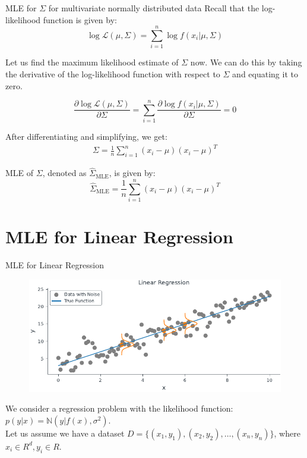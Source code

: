 \documentclass[handout]{beamer}
\begin{document}
\begin{frame}{MLE for $\Sigma$ for multivariate normally distributed data}
    Recall that the log-likelihood function is given by:
    \begin{equation}
        \log \mathcal{L}(\mu, \Sigma) = \sum_{i=1}^n \log f(x_i|\mu, \Sigma)
    \end{equation}

    Let us find the maximum likelihood estimate of $\Sigma$ now. We can do this by taking the derivative of the log-likelihood function with respect to $\Sigma$ and equating it to zero.   

    \begin{equation}
        \frac{\partial \log \mathcal{L}(\mu, \Sigma)}{\partial \Sigma} = \sum_{i=1}^n \frac{\partial \log f(x_i|\mu, \Sigma)}{\partial \Sigma} = 0
    \end{equation}
    
\end{frame}
\begin{frame}
    After differentiating and simplifying, we get:
    \begin{align*}
      \Sigma = \frac{1}{n}\sum_{i=1}^n(x_i-\mu)(x_i-\mu)^T  
    \end{align*} 

    \begin{tcolorbox}[colback=metropolisblue!5,colframe=metropolisblue,title=Maximum Likelihood Estimate for $\Sigma$]
        MLE of $\Sigma$, denoted as $\hat{\Sigma}_{\text{MLE}}$, is given by:
        \begin{equation*}
            \hat{\Sigma}_{\text{MLE}} = \frac{1}{n}\sum_{i=1}^n (x_i-\mu)(x_i-\mu)^T
        \end{equation*}
    \end{tcolorbox}
\end{frame}

\section{MLE for Linear Regression}
\begin{frame}{MLE for Linear Regression}
\begin{figure}
                \centerline{\includegraphics[scale=0.7]{../figures/mle/normal_likelihood_lin_reg.pdf}}
\end{figure}
We consider a regression problem with the likelihood function: $p(y|x) = \mathbb{N}(y|f(x), \sigma^2)$.\\
Let us assume we have a dataset $D = \{(x_1, y_1), (x_2,y_2), \ldots, (x_n, y_n)\}$, where $x_i\in R^d, y_i\in R$. 
\end{frame}
\end{document}
